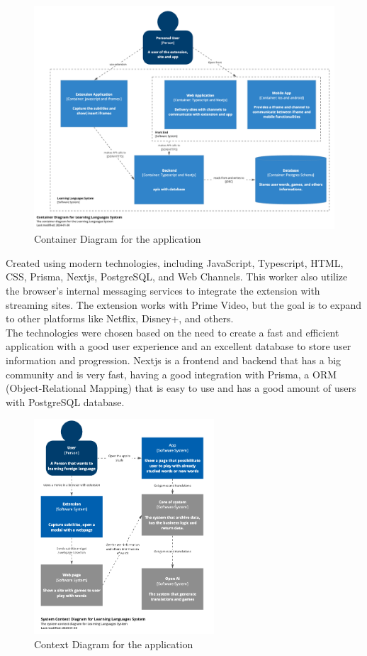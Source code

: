\documentclass[12pt]{article}
\begin{document}
\begin{figure}[!h]
  \centering
  \caption{
    Container Diagram for the application
  }
  \label{fig:container_diagram}
  \includegraphics[width=1\textwidth]{assets/24.png}
\end{figure}
Created using modern technologies, including JavaScript, Typescript, HTML, CSS, Prisma, Nextjs, PostgreSQL, and Web Channels. This worker  also utilize the browser's internal messaging services to integrate the extension with streaming sites. The extension works with Prime Video, but the goal is to expand to other platforms like Netflix, Disney+, and others. \\
The technologies were chosen based on the need to create a fast and efficient application with a good user experience and an excellent database to store user information and progression. Nextjs is a frontend and backend that has a big community and is very fast, having a good integration with Prisma, a ORM (Object-Relational Mapping) that is easy to use and has a good amount of users with PostgreSQL database. 
\begin{figure}[!h]
\centering
\caption{
Context Diagram for the application
}
\label{fig:context_diagram}
\includegraphics[width=0.6\textwidth]{assets/4.png}
\end{figure}
\end{document}
